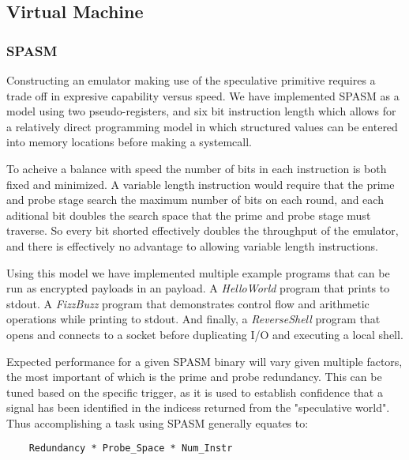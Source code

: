 \FigSpecBandwidth
%

\subsection{Virtual Machine}


\subsubsection{SPASM}
\label{subsubsec:spasm}
Constructing an emulator making use of the speculative primitive requires  
a trade off in expresive capability versus speed. 
We have implemented SPASM as a model using two pseudo-registers, and six 
bit instruction length which allows for a relatively direct programming model 
in which structured values can be entered into memory locations before making 
a systemcall.

To acheive a balance with speed the number of bits in each instruction is both 
fixed and minimized.  A variable length instruction would require that the prime
and probe stage search the maximum number of bits on each round, and each 
aditional bit doubles the search space that the prime and probe stage must 
traverse.  So every bit shorted effectively doubles the throughput of the 
emulator, and there is effectively no advantage to allowing variable length 
instructions. 

Using this model we have implemented multiple example programs that can be run
as encrypted payloads in an \speculake payload. A \textit{HelloWorld} program 
that prints to stdout. A \textit{FizzBuzz} program that demonstrates control 
flow and arithmetic operations while printing to stdout. And finally,
a \textit{ReverseShell} program that opens and connects to a socket before  
duplicating I/O and executing a local shell. 

Expected performance for a given SPASM binary will vary given multiple factors, 
the most important of which is the prime and probe redundancy. This can be tuned
based on the specific trigger, as it is used to establish confidence that a signal 
has been identified in the indicess returned from the "speculative world". 
Thus accomplishing a task using SPASM generally equates to:

\begin{lstlisting}
    Redundancy * Probe_Space * Num_Instr
\end{lstlisting}

